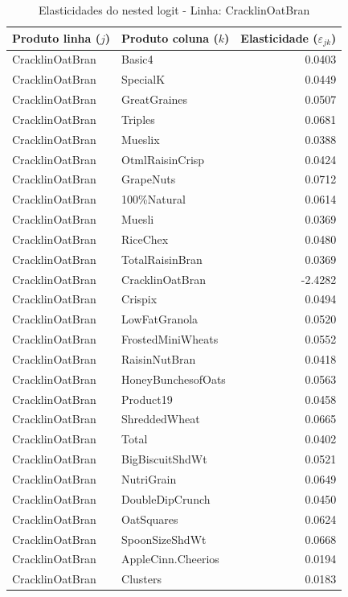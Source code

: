\begingroup
\begin{table}[H]
\centering
\caption{Elasticidades do nested logit - Linha: CracklinOatBran}
\label{tab:elas-nested-cracklinoatbran}
\small
\begin{tabular}{llr}
\toprule
Produto linha ($j$) & Produto coluna ($k$) & Elasticidade ($\varepsilon_{jk}$) \\
\midrule
CracklinOatBran & Basic4 & 0.0403 \\
CracklinOatBran & SpecialK & 0.0449 \\
CracklinOatBran & GreatGraines & 0.0507 \\
CracklinOatBran & Triples & 0.0681 \\
CracklinOatBran & Mueslix & 0.0388 \\
CracklinOatBran & OtmlRaisinCrisp & 0.0424 \\
CracklinOatBran & GrapeNuts & 0.0712 \\
CracklinOatBran & 100\%Natural & 0.0614 \\
CracklinOatBran & Muesli & 0.0369 \\
CracklinOatBran & RiceChex & 0.0480 \\
CracklinOatBran & TotalRaisinBran & 0.0369 \\
CracklinOatBran & CracklinOatBran & -2.4282 \\
CracklinOatBran & Crispix & 0.0494 \\
CracklinOatBran & LowFatGranola & 0.0520 \\
CracklinOatBran & FrostedMiniWheats & 0.0552 \\
CracklinOatBran & RaisinNutBran & 0.0418 \\
CracklinOatBran & HoneyBunchesofOats & 0.0563 \\
CracklinOatBran & Product19 & 0.0458 \\
CracklinOatBran & ShreddedWheat & 0.0665 \\
CracklinOatBran & Total & 0.0402 \\
CracklinOatBran & BigBiscuitShdWt & 0.0521 \\
CracklinOatBran & NutriGrain & 0.0649 \\
CracklinOatBran & DoubleDipCrunch & 0.0450 \\
CracklinOatBran & OatSquares & 0.0624 \\
CracklinOatBran & SpoonSizeShdWt & 0.0668 \\
CracklinOatBran & AppleCinn.Cheerios & 0.0194 \\
CracklinOatBran & Clusters & 0.0183 \\

\end{tabular}
\end{table}
